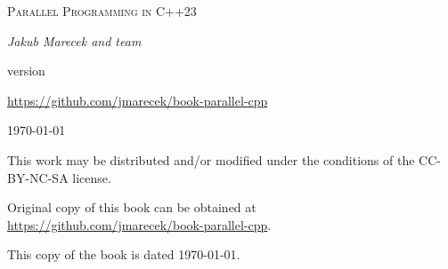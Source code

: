 \begin{titlepage}
	\centering
	\vspace{2cm}
	{\scshape\huge Parallel Programming in C++23\par}
	\vspace{2cm}
	{\Large\itshape Jakub Marecek and team\par}
	\vfill
	version \version\par
	\href{https://github.com/jmarecek/book-parallel-cpp}{https://github.com/jmarecek/book-parallel-cpp}

	\vfill

	{\large \today\par}
\end{titlepage}

\pagestyle{empty}
\begingroup
\footnotesize
\parindent 0pt
\parskip \baselineskip
\vfill

This work may be distributed and/or modified under the conditions of the CC-BY-NC-SA license.

Original copy of this book can be obtained at \href{https://github.com/jmarecek/book-parallel-cpp}{https://github.com/jmarecek/book-parallel-cpp}.

This copy of the book is dated \today.

\vfill

\vspace*{2\baselineskip}


\endgroup
\clearpage
\pagestyle{plain}